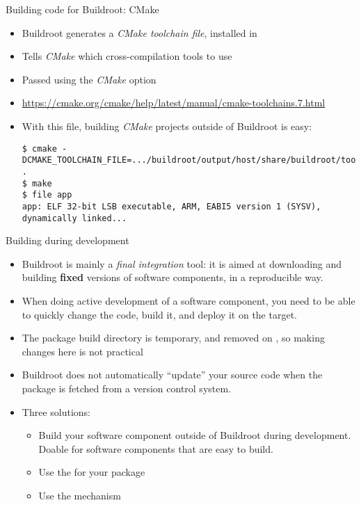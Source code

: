 \begin{frame}[fragile]{Building code for Buildroot: CMake}
  \begin{itemize}
  \item Buildroot generates a {\em CMake toolchain file}, installed in
  \item Tells {\em CMake} which cross-compilation tools to use
  \item Passed using the  {\em CMake} option
  \item \url{https://cmake.org/cmake/help/latest/manual/cmake-toolchains.7.html}
  \item With this file, building {\em CMake} projects outside of
    Buildroot is easy:
    \begin{block}{}
{\scriptsize
\begin{verbatim}
$ cmake -DCMAKE_TOOLCHAIN_FILE=.../buildroot/output/host/share/buildroot/toolchainfile.cmake .
$ make
$ file app
app: ELF 32-bit LSB executable, ARM, EABI5 version 1 (SYSV), dynamically linked...
\end{verbatim}}
\end{block}
\end{itemize}
\end{frame}

\begin{frame}{Building during development}
  \begin{itemize}
  \item Buildroot is mainly a {\em final integration} tool: it is
    aimed at downloading and building {\bf fixed} versions of software
    components, in a reproducible way.
  \item When doing active development of a software component, you
    need to be able to quickly change the code, build it, and deploy
    it on the target.
  \item The package build directory is temporary, and removed on
    , so making changes here is not practical
  \item Buildroot does not automatically ``update'' your source code
    when the package is fetched from a version control system.
  \item Three solutions:
    \begin{itemize}
    \item Build your software component outside of Buildroot during
      development. Doable for software components that are easy to
      build.
    \item Use the   for your package
    \item Use the  mechanism
    \end{itemize}
  \end{itemize}
\end{frame}

